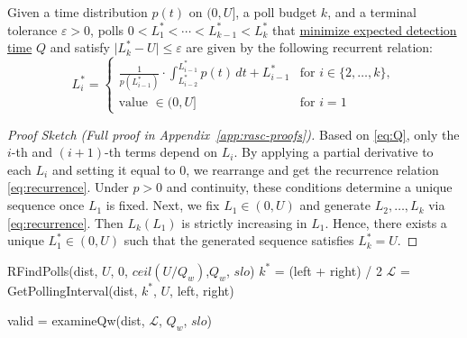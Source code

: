 {\begin{theorem}
Given a time distribution $p(t)$ on $(0,U]$, a poll budget $k$, and a terminal tolerance $\varepsilon>0$,
polls
$0<{L_1^{\!*}}<\cdots<L_{k-1}^{\!*}<L_k^{\!*}$
that \underline{minimize 
expected detection time} $Q$ and  satisfy $\lvert L_k^{\!*}-U\rvert\le\varepsilon$ are given by the following recurrent relation:
\[
L_i^{\!*} =
\begin{cases} 
\frac{1}{p(L_{i-1}^{\!*})} \cdot \int_{L_{i-2}^{\!*}}^{L_{i-1}^{\!*}} p(t)\, dt + L_{i-1}^{\!*} & \text{for } i \in \{2,\dots,k\}, \\
\text{value } \in (0,U] & \text{for } i=1
\end{cases} \tag{3} \label{eq:recurrence}
\]
\end{theorem}
\vspace{-0.5cm}

\begin{proof}[Proof Sketch (Full proof in Appendix~\ref{app:rasc-proofs})]
Based on \eqref{eq:Q}, only the $i$-th and $(i+1)$-th terms depend on $L_i$.
By applying a partial derivative to each $L_i$ and setting it equal to 0, we rearrange and get the recurrence relation \eqref{eq:recurrence}.
Under $p>0$ and continuity, these conditions determine a unique sequence once $L_1$ is fixed.
%
Next, we fix $L_1\in(0,U)$ and generate $L_2,\dots,L_k$ via \eqref{eq:recurrence}.
Then $L_k(L_1)$ is strictly increasing in $L_1$.
Hence, there exists a unique $L_1^*\in(0,U)$ such that the generated sequence satisfies $L_k^*=U$.
\end{proof}

\vspace{-0.2cm}

\begin{algorithm}[t!]
    \caption{\bf Adaptive Polling Algorithm}
    \label{algo:adaptive-polling-algorithm}
    \footnotesize
    \begin{algorithmic}[1]
            \State \Return RFindPolls(dist, $U$, 0, $ceil(U/Q_w)$,$Q_w$, $slo$)
        \EndProcedure
            \State $k^*$ = (left + right) / 2
            \State $\mathcal{L}$ = GetPollingInterval(dist, $k^*$, $U$, left, right)

            \State valid = examineQw(dist, $\mathcal{L}$, $Q_w$, $slo$)


\end{algorithmic}
\end{algorithm}}
